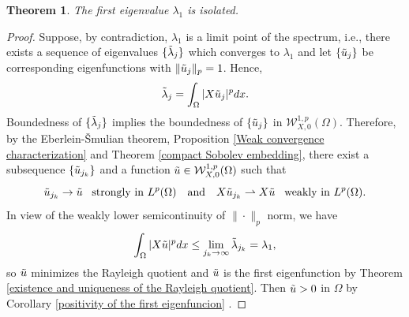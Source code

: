 \documentclass[a4paper,12pt,reqno]{amsart}
\numberwithin{equation}{section}
\theoremstyle{plain}
\newtheorem{theorem}{Theorem}[section]
\theoremstyle{definition}
\begin{document}
\begin{theorem}\label{isolated theorem}
The first eigenvalue $\lambda_{1}$ is isolated.
\end{theorem}
\begin{proof}
Suppose, by contradiction,  $\lambda_{1}$ is a limit point of the spectrum, i.e., there exists  a sequence of eigenvalues $\{\Tilde{\lambda}_{j}\}$ which converges to $\lambda_{1}$
 and let $\{\Tilde{u}_{j}\}$ be  corresponding eigenfunctions with $\|\Tilde{u}_{j}\|_{p}=1$. Hence,
\begin{equation*}
\Tilde{\lambda}_{j}=\int_{\Omega}|X\Tilde{u}_{j}|^{p}dx. 
\end{equation*}
Boundedness of $\{\Tilde{\lambda}_{j}\}$ implies the boundedness of $\{\Tilde{u}_{j}\}$ in $\mathcal{W}_{X,0}^{1, p}(\Omega)$. Therefore, by the Eberlein-\v{S}mulian theorem, Proposition \ref{Weak convergence characterization} and Theorem \ref{compact Sobolev embedding}, there exist a subsequence $\{\Tilde{u}_{j_{k}}\}$ and a function $\Tilde{u}\in \mathcal{W}_{X,0}^{1, p}(\Omega)$ such that
\begin{equation*}
\Tilde{u}_{j_{k}} \to \Tilde{u}\enspace \text{ strongly in } L^{p}(\Omega)\quad \text{and} \quad X \Tilde{u}_{j_{k}} \rightharpoonup  X \Tilde{u} \enspace \text{ weakly in } L^{p}(\Omega). 
\end{equation*}
In view of the weakly lower semicontinuity of $\|\cdot\|_{p}$ norm, we have
\begin{equation*}
\int_{\Omega}|X \Tilde{u}|^{p}dx \leq \lim_{j_{k}\to\infty}\Tilde{\lambda}_{j_{k}} =\lambda_{1}, 
\end{equation*}
so $\Tilde{u}$ minimizes the Rayleigh quotient and $\Tilde{u}$ is the first eigenfunction by Theorem \ref{existence and uniqueness of the Rayleigh quotient}. Then $\Tilde{u}>0$ in $\Omega$ by Corollary \ref{positivity of the first eigenfuncion} .


\end{proof}
\end{document}

